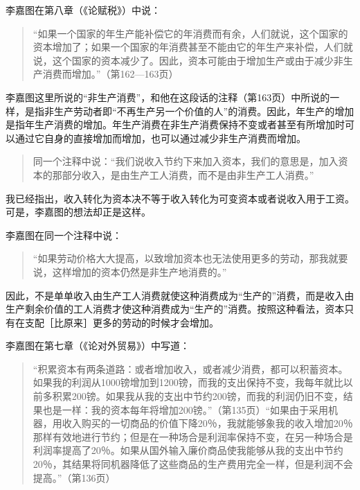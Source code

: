 
李嘉图在第八章（《论赋税》）中说：

\begin{quote}{“如果一个国家的年生产能补偿它的年消费而有余，人们就说，这个国家的资本增加了；如果一个国家的年消费甚至不能由它的年生产来补偿，人们就说，这个国家的资本减少了。因此，资本可能由于增加生产或由于减少非生产消费而增加。”（第162—163页）}\end{quote}

李嘉图这里所说的“非生产消费”，和他在这段话的注释（第163页）中所说的一样，是指非生产劳动者即“不再生产另一个价值的人”的消费。因此，年生产的增加是指年生产消费的增加。年生产消费在非生产消费保持不变或者甚至有所增加时可以通过它自身的直接增加而增加，也可以通过减少非生产消费而增加。

\begin{quote}{同一个注释中说：“我们说收入节约下来加入资本，我们的意思是，加入资本的那部分收入，是由生产工人消费，而不是由非生产工人消费。”}\end{quote}

我已经指出，收入转化为资本决不等于收入转化为可变资本或者说收入用于工资。可是，李嘉图的想法却正是这样。

李嘉图在同一个注释中说：

\begin{quote}{“如果劳动价格大大提高，以致增加资本也无法使用更多的劳动，那我就要说，这样增加的资本仍然是非生产地消费的。”}\end{quote}

因此，不是单单收入由生产工人消费就使这种消费成为“生产的”消费，而是收入由生产剩余价值的工人消费才使这种消费成为“生产的”消费。按照这种看法，资本只有在支配［比原来］更多的劳动的时候才会增加。

李嘉图在第七章（《论对外贸易》）中写道：

\begin{quote}{“积累资本有两条道路：或者增加收入，或者减少消费，都可以积蓄资本。如果我的利润从1000镑增加到1200镑，而我的支出保持不变，我每年就比以前多积累200镑。如果我从我的支出中节约200镑，而我的利润仍旧不变，结果也是一样：我的资本每年将增加200镑。”（第135页）“如果由于采用机器，用收入购买的一切商品的价值下降20％，我就能够象我的收入增加20％那样有效地进行节约；但是在一种场合是利润率保持不变，在另一种场合是利润率提高了20％。如果从国外输入廉价商品使我能够从我的支出中节约20％，其结果将同机器降低了这些商品的生产费用完全一样，但是利润不会提高。”（第136页）}\end{quote}

